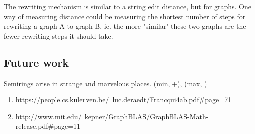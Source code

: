 \documentclass[11pt]{article}
\begin{document}
    The rewriting mechanism is similar to a string edit distance, but for graphs. One way of measuring distance could be measuring the shortest number of steps for rewriting a graph A to graph B, ie. the more "similar" these two graphs are the fewer rewriting steps it should take.

    \subsection{Future work}

    Semirings arise in strange and marvelous places. (min, +), (max, \times)

    \begin{enumerate}
    \item https://people.cs.kuleuven.be/~luc.deraedt/Francqui4ab.pdf#page=71
    \item http://www.mit.edu/~kepner/GraphBLAS/GraphBLAS-Math-release.pdf#page=11
    \end{enumerate}

    
    
\end{document}
